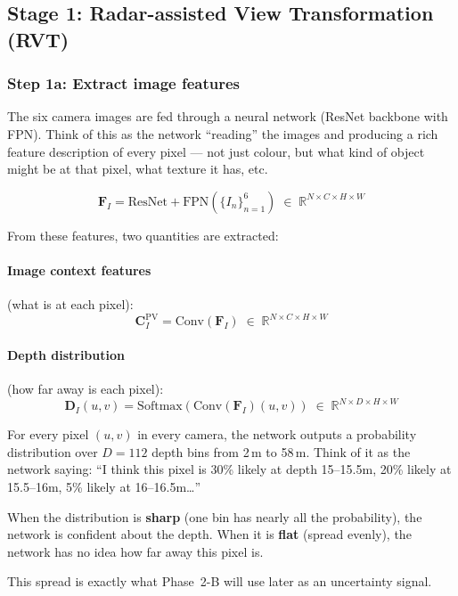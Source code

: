 \documentclass[12pt, a4paper]{article}
\newcommand{\pv}{\mathrm{PV}}
\newcommand{\DI}{\mathbf{D}_{I}}
\newcommand{\CI}{\mathbf{C}_{I}}
\newcommand{\FI}{\mathbf{F}_{I}}
\newcommand{\R}{\mathbb{R}}
\theoremstyle{definition}
\begin{document}
\subsection{Stage 1: Radar-assisted View Transformation (RVT)}

\subsubsection{Step 1a: Extract image features}

\begin{plainbox}
The six camera images are fed through a neural network (ResNet backbone with FPN).
Think of this as the network ``reading'' the images and producing a rich feature
description of every pixel --- not just colour, but what kind of object might be
at that pixel, what texture it has, etc.
\end{plainbox}

\begin{equation}
  \FI = \mathrm{ResNet{+}FPN}(\{I_n\}_{n=1}^{6})
  \;\in\; \R^{N \times C \times H \times W}
\end{equation}

From these features, two quantities are extracted:

\paragraph{Image context features} (what is at each pixel):
\begin{equation}
  \CI^\pv = \mathrm{Conv}(\FI)
  \;\in\; \R^{N \times C \times H \times W}
\end{equation}

\paragraph{Depth distribution} (how far away is each pixel):
\begin{equation}
  \DI(u,v) = \mathrm{Softmax}\!\left(\mathrm{Conv}(\FI)(u,v)\right)
  \;\in\; \R^{N \times D \times H \times W}
  \label{eq:depth_dist}
\end{equation}

\begin{plainbox}
For every pixel $(u,v)$ in every camera, the network outputs a probability
distribution over $D = 112$ depth bins from 2\,m to 58\,m.
Think of it as the network saying:
``I think this pixel is 30\% likely at depth 15--15.5m,
20\% likely at 15.5--16m, 5\% likely at 16--16.5m\ldots''

When the distribution is \textbf{sharp} (one bin has nearly all the probability),
the network is confident about the depth.
When it is \textbf{flat} (spread evenly), the network has no idea how far away
this pixel is.

This spread is exactly what Phase~2-B will use later as an uncertainty signal.
\end{plainbox}
\end{document}
